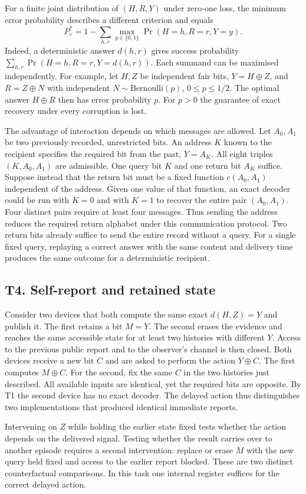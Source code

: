 For a finite joint distribution of $(H,R,Y)$ under zero-one loss, the minimum error probability describes a different criterion and equals
\[
 P_e^*=1-\sum_{h,r}\max_{y\in\{0,1\}}\Pr(H=h,R=r,Y=y).
\]
Indeed, a deterministic answer $d(h,r)$ gives success probability $\sum_{h,r}\Pr(H=h,R=r,Y=d(h,r))$. Each summand can be maximised independently. For example, let $H,Z$ be independent fair bits, $Y=H\oplus Z$, and $R=Z\oplus N$ with independent $N\sim\mathrm{Bernoulli}(p)$, $0\le p\le 1/2$. The optimal answer $H\oplus R$ then has error probability $p$. For $p>0$ the guarantee of exact recovery under every corruption is lost.

The advantage of interaction depends on which messages are allowed. Let $A_0,A_1$ be two previously recorded, unrestricted bits. An address $K$ known to the recipient specifies the required bit from the past, $Y=A_K$. All eight triples $(K,A_0,A_1)$ are admissible. One query bit $K$ and one return bit $A_K$ suffice. Suppose instead that the return bit must be a fixed function $c(A_0,A_1)$ independent of the address. Given one value of that function, an exact decoder could be run with $K=0$ and with $K=1$ to recover the entire pair $(A_0,A_1)$. Four distinct pairs require at least four messages. Thus sending the address reduces the required return alphabet under this communication protocol. Two return bits already suffice to send the entire record without a query. For a single fixed query, replaying a correct answer with the same content and delivery time produces the same outcome for a deterministic recipient.

\subsection{T4. Self-report and retained state}
\label{thm:observer-t4}

Consider two devices that both compute the same exact $d(H,Z)=Y$ and publish it. The first retains a bit $M=Y$. The second erases the evidence and reaches the same accessible state for at least two histories with different $Y$. Access to the previous public report and to the observer's channel is then closed. Both devices receive a new bit $C$ and are asked to perform the action $Y\oplus C$. The first computes $M\oplus C$. For the second, fix the same $C$ in the two histories just described. All available inputs are identical, yet the required bits are opposite. By T1 the second device has no exact decoder. The delayed action thus distinguishes two implementations that produced identical immediate reports.

Intervening on $Z$ while holding the earlier state fixed tests whether the action depends on the delivered signal. Testing whether the result carries over to another episode requires a second intervention: replace or erase $M$ with the new query held fixed and access to the earlier report blocked. These are two distinct counterfactual comparisons. In this task one internal register suffices for the correct delayed action.
